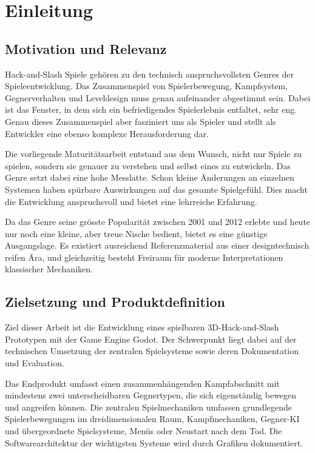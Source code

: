 \documentclass[../Main.tex]{subfiles}
\begin{document}
\section{Einleitung}

\subsection{Motivation und Relevanz}

Hack-and-Slash Spiele gehören zu den technisch anspruchsvollsten Genres der Spieleentwicklung. Das Zusammenspiel von Spielerbewegung, Kampfsystem, Gegnerverhalten und Leveldesign muss genau aufeinander abgestimmt sein. Dabei ist das Fenster, in dem sich ein befriedigendes Spielerlebnis entfaltet, sehr eng. Genau dieses Zusammenspiel aber fasziniert uns als Spieler und stellt als Entwickler eine ebenso komplexe Herausforderung dar.

Die vorliegende Maturitätsarbeit entstand aus dem Wunsch, nicht nur Spiele zu spielen, sondern sie genauer zu verstehen und selbst eines zu entwickeln. Das Genre setzt dabei eine hohe Messlatte. Schon kleine Änderungen an einzelnen Systemen haben spürbare Auswirkungen auf das gesamte Spielgefühl. Dies macht die Entwicklung anspruchsvoll und bietet eine lehrreiche Erfahrung.

Da das Genre seine grösste Popularität zwischen 2001 und 2012 erlebte und heute nur noch eine kleine, aber treue Nische bedient, bietet es eine günstige Ausgangslage. Es existiert ausreichend Referenzmaterial aus einer designtechnisch reifen Ära, und gleichzeitig besteht Freiraum für moderne Interpretationen klassischer Mechaniken.


\subsection{Zielsetzung und Produktdefinition}

Ziel dieser Arbeit ist die Entwicklung eines spielbaren 3D-Hack-and-Slash Prototypen mit der Game Engine Godot. Der Schwerpunkt liegt dabei auf der technischen Umsetzung der zentralen Spielsysteme sowie deren Dokumentation und Evaluation.

Das Endprodukt umfasst einen zusammenhängenden Kampfabschnitt mit mindestens zwei unterscheidbaren Gegnertypen, die sich eigenständig bewegen und angreifen können. Die zentralen Spielmechaniken umfassen grundlegende Spielerbewegungen im dreidimensionalen Raum, Kampfmechaniken, Gegner-KI und übergeordnete Spielsysteme, Menüs oder Neustart nach dem Tod. Die Softwarearchitektur der wichtigsten Systeme wird durch Grafiken dokumentiert.
\end{document}
